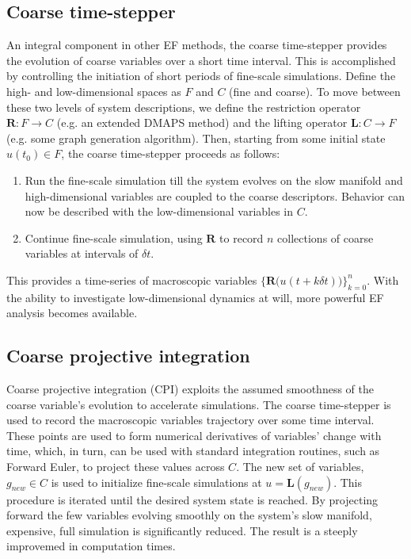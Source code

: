 \documentclass[11pt]{article}
\begin{document}
\subsection{Coarse time-stepper}
\indent An integral component in other EF methods, the coarse time-stepper provides the evolution of coarse variables over a short time interval. This is accomplished by controlling the initiation of short periods of fine-scale simulations. Define the high- and low-dimensional spaces as $F$ and $C$ (fine and coarse). To move between these two levels of system descriptions, we define the restriction operator $\textbf{R}: F \rightarrow C$ (e.g. an extended DMAPS method) and the lifting operator $\textbf{L}: C \rightarrow F$ (e.g. some graph generation algorithm). Then, starting from some initial state $u(t_{0}) \in F$, the coarse time-stepper proceeds as follows:
\begin{enumerate}
\item Run the fine-scale simulation till the system evolves on the slow manifold and high-dimensional variables are coupled to the coarse descriptors. Behavior can now be described with the low-dimensional variables in $C$.
\item Continue fine-scale simulation, using $\textbf{R}$ to record $n$ collections of coarse variables at intervals of $\delta t$. 
\end{enumerate}
This provides a time-series of macroscopic variables $\{ \textbf{R(}u(t+k\delta t) \textbf{)} \}_{k=0}^{n}$. With the ability to investigate low-dimensional dynamics at will, more powerful EF analysis becomes available. 
\subsection{Coarse projective integration}
\indent Coarse projective integration (CPI) exploits the assumed smoothness of the coarse variable's evolution to accelerate simulations. The coarse time-stepper is used to record the macroscopic variables trajectory over some time interval. These points are used to form numerical derivatives of variables' change with time, which, in turn, can be used with standard integration routines, such as Forward Euler, to project these values across $C$. The new set of variables, $g_{new} \in C$ is used to initialize fine-scale simulations at $u = \textbf{L}(g_{new})$. This procedure is iterated until the desired system state is reached. By projecting forward the few variables evolving smoothly on the system's slow manifold, expensive, full simulation is significantly reduced. The result is a steeply improvemed in computation times.
\end{document}
